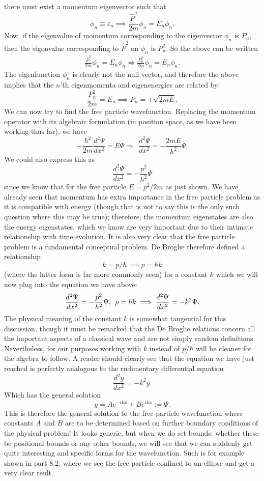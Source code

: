 there must exist a momentum eigenvector such that
$$
\phi_{n}\equiv\varepsilon_{n}\implies \frac{\hat{P}^2}{2m}\phi_{n}=E_{n}\phi_{n}.
$$
Now, if the eigenvalue of momentum corresponding to the eigenvector $\phi_{n}$ is $P_{n}$, then the eigenvalue corresponding to $\hat{P}^2$ on $\phi_{n}$ is $P_{n}^{2}$. So the above can be written
$$
\begin{aligned}
\frac{\hat{P}^2}{2m}\phi_{n}=E_{n}\phi_{n}\iff\frac{P_{n}^{2}}{2m}\phi_{n}=E_{n}\phi_{n}.
\end{aligned}
$$
The eigenfunction $\phi_{n}$ is clearly not the null vector, and therefore the above implies that the $n$'th eigenmomenta and eigenenergies are related by:
$$
\frac{P_{n}^{2}}{2m}=E_{n}\implies P_{n}=\pm\sqrt{2mE}.
$$
We can now try to find the free particle wavefunction. Replacing the momentum operator with its algebraic formulation (in position space, as we have been working thus far), we have
$$
-{\frac{\hbar^2}{2m}}\frac{d^2\Psi}{dx^2} = E\Psi \Rightarrow\:\: \frac{d^2\Psi}{dx^2} =-{\frac{2mE}{h^2}}\Psi.
$$
We could also express this as 
$$
\frac{d^2\Psi}{dx^2} =-{\frac{p^2}{h^2}}\Psi
$$
since we know that for the free particle $E=p^2/2m$ as just shown. We have already seen that momentum has extra importance in the free particle problem as it is compatible with energy (though that is not to say this is the only such question where this may be true); therefore, the momentum eigenstates are also the energy eigenstates, which we know are very important due to their intimate relationship with time evolution. It is also very clear that the free particle problem is a fundamental conceptual problem. De Broglie therefore defined a relationship
$$
k=p/\hbar \implies p = \hbar k
$$
(where the latter form is far more commonly seen) for a constant $k$ which we will now plug into the equation we have above:
$$
\frac{d^2\Psi}{dx^2} =-{\frac{p^2}{h^2}}\Psi, \:\: p=\hbar k \implies \frac{d^2\Psi}{dx^2} =-k^2\Psi.
$$
The physical meaning of the constant $k$ is somewhat tangential for this discussion, though it must be remarked that the De Broglie relations concern all the important aspects of a classical wave and are not simply random definitions. Nevertheless, for our purposes working with $k$ instead of $p/\hbar$ will be cleaner for the algebra to follow. A reader should clearly see that the equation we have just reached is perfectly analogous to the rudimentary differential equation 
$$
\frac{d^2y}{dx^2}=-k^2y.
$$
Which has the general solution
$$
y=Ae^{-ikx}+Be^{ikx}:=\Psi.
$$
This is therefore the general solution to the free particle wavefunction where constants $A$ and $B$ are to be determined based on further boundary conditions of the physical problem! It looks generic, but when we do set bounds: whether these be positional bounds or any other bounds, we will see that we can suddenly get quite interesting and specific forms for the wavefunction. Such is for example shown in part 8.2, where we see the free particle confined to an ellipse and get a very clear reult.
